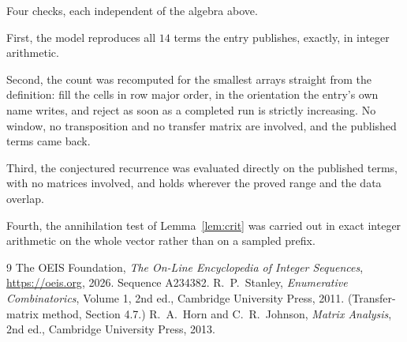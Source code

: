\documentclass[11pt,a4paper]{article}
\theoremstyle{plain}
\theoremstyle{definition}
\begin{document}
Four checks, each independent of the algebra above.

First, the model reproduces all $14$ terms the entry publishes, exactly, in integer
arithmetic.

Second, the count was recomputed for the smallest arrays straight from the definition: fill the
cells in row major order, in the orientation the entry's own name writes, and reject as soon as
a completed run is strictly increasing. No window, no transposition and no transfer matrix are involved, and
the published terms came back.

Third, the conjectured recurrence was evaluated directly on the published terms, with no
matrices involved, and holds wherever the proved range and the data overlap.

Fourth, the annihilation test of Lemma~\ref{lem:crit} was carried out in exact integer
arithmetic on the whole vector rather than on a sampled prefix.

\begin{thebibliography}{9}
 The OEIS Foundation, \emph{The On-Line Encyclopedia of Integer
Sequences}, \url{https://oeis.org}, 2026. Sequence A234382.
 R.~P.~Stanley, \emph{Enumerative Combinatorics}, Volume 1, 2nd ed.,
Cambridge University Press, 2011. (Transfer-matrix method, Section 4.7.)
 R.~A.~Horn and C.~R.~Johnson, \emph{Matrix Analysis}, 2nd ed., Cambridge
University Press, 2013.
\end{thebibliography}
\end{document}
